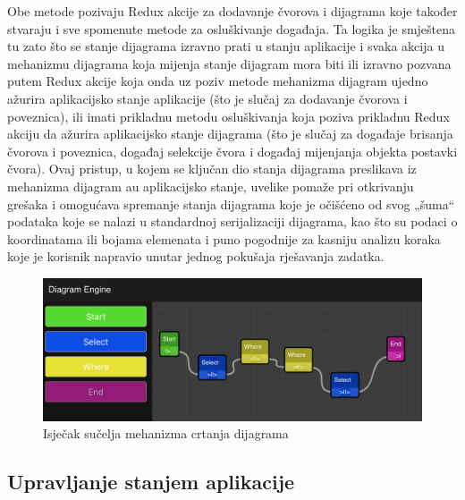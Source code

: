 \documentclass[times, utf8, diplomski, numeric]{fer}
\newcommand{\razmaks}{\vspace{10pt}}
\begin{document}
Obe metode pozivaju Redux akcije za dodavanje čvorova i dijagrama koje također stvaraju i sve spomenute metode za osluškivanje događaja.
Ta logika je smještena tu zato što se stanje dijagrama izravno prati u stanju aplikacije i svaka akcija u mehanizmu dijagrama koja mijenja stanje dijagram mora biti ili izravno pozvana putem Redux akcije koja onda uz poziv metode mehanizma dijagram ujedno ažurira aplikacijsko stanje aplikacije (što je slučaj za dodavanje čvorova i poveznica), ili imati prikladnu metodu osluškivanja koja poziva prikladnu Redux akciju da ažurira aplikacijsko stanje dijagrama (što je slučaj za događaje brisanja čvorova i poveznica, događaj selekcije čvora i događaj mijenjanja objekta postavki čvora).
Ovaj pristup, u kojem se ključan dio stanja dijagrama preslikava iz mehanizma dijagram au aplikacijsko stanje, uvelike pomaže pri otkrivanju grešaka i omogućava spremanje stanja dijagrama koje je očišćeno od svog „šuma“ podataka koje se nalazi u standardnoj serijalizaciji dijagrama, kao što su podaci o koordinatama ili bojama elemenata i puno pogodnije za kasniju analizu koraka koje je korisnik napravio unutar jednog pokušaja rješavanja zadatka.

\begin{figure}[!htb] %
  \razmaks
  \centering
  \includegraphics[width=14.4cm]{images/diagram.png}
  \caption{Isječak sučelja mehanizma crtanja dijagrama}
  \label{fig:diagram}
  \razmaks
\end{figure}

\razmaks
\subsection{Upravljanje stanjem aplikacije} \label{sec:state}
\end{document}
